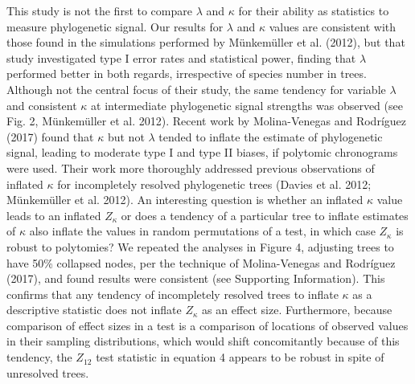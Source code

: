 \documentclass[]{article}
\begin{document}
This study is not the first to compare \(\lambda\) and \(\kappa\) for
their ability as statistics to measure phylogenetic signal. Our results
for \(\lambda\) and \(\kappa\) values are consistent with those found in
the simulations performed by Münkemüller et al. (2012), but that study
investigated type I error rates and statistical power, finding that
\(\lambda\) performed better in both regards, irrespective of species
number in trees. Although not the central focus of their study, the same
tendency for variable \(\lambda\) and consistent \(\kappa\) at
intermediate phylogenetic signal strengths was observed (see Fig. 2,
Münkemüller et al. 2012). Recent work by Molina-Venegas and Rodríguez
(2017) found that \(\kappa\) but not \(\lambda\) tended to inflate the
estimate of phylogenetic signal, leading to moderate type I and type II
biases, if polytomic chronograms were used. Their work more thoroughly
addressed previous observations of inflated \(\kappa\) for incompletely
resolved phylogenetic trees (Davies et al. 2012; Münkemüller et al.
2012). An interesting question is whether an inflated \(\kappa\) value
leads to an inflated \(Z_\kappa\) or does a tendency of a particular
tree to inflate estimates of \(\kappa\) also inflate the values in
random permutations of a test, in which case \(Z_\kappa\) is robust to
polytomies? We repeated the analyses in Figure 4, adjusting trees to
have 50\% collapsed nodes, per the technique of Molina-Venegas and
Rodríguez (2017), and found results were consistent (see Supporting
Information). This confirms that any tendency of incompletely resolved
trees to inflate \(\kappa\) as a descriptive statistic does not inflate
\(Z_\kappa\) as an effect size. Furthermore, because comparison of
effect sizes in a test is a comparison of locations of observed values
in their sampling distributions, which would shift concomitantly because
of this tendency, the \(Z_{12}\) test statistic in equation 4 appears to
be robust in spite of unresolved trees. \hfill\break  
\end{document}
